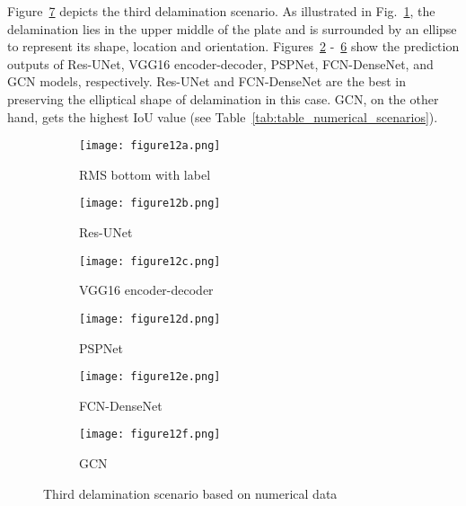 Figure~\ref{fig:475_softmax} depicts the third delamination scenario.
As illustrated in Fig.~\ref{fig:RMS_flat_shell_Vz_475}, the delamination lies in the upper middle of the plate and is surrounded by an ellipse to represent its shape, location and orientation.
Figures~\ref{fig:Unet_Pred__softmax_475} -~\ref{fig:gcn_pred_475} show the prediction outputs of Res-UNet, VGG16 encoder-decoder, PSPNet, FCN-DenseNet, and GCN models, respectively.
Res-UNet and FCN-DenseNet are the best in preserving the elliptical shape of delamination in this case.
GCN, on the other hand, gets the highest IoU value (see Table~\ref{tab:table_numerical_scenarios}).
\begin{figure}[!h]
	\centering
	\begin{subfigure}[b]{0.47\textwidth}
		\centering
		\texttt{[image: figure12a.png]}
		\caption{RMS bottom with label}
		\label{fig:RMS_flat_shell_Vz_475}
	\end{subfigure}
	\hfill
	\begin{subfigure}[b]{0.47\textwidth}
		\centering
		\texttt{[image: figure12b.png]}
		\caption{Res-UNet}
		\label{fig:Unet_Pred__softmax_475}
	\end{subfigure}
	\hfill
	\begin{subfigure}[b]{0.47\textwidth}
		\centering
		\texttt{[image: figure12c.png]}
		\caption{VGG16 encoder-decoder}			\label{fig:vgg16_pred__softmax_475}			
	\end{subfigure}
	\hfill
	\begin{subfigure}[b]{0.47\textwidth}
		\centering
		\texttt{[image: figure12d.png]}
		\caption{PSPNet}
		\label{fig:pspnet_pred__softmax_475}
	\end{subfigure}	
	\hfill
	\begin{subfigure}[b]{0.47\textwidth}
		\centering
		\texttt{[image: figure12e.png]}
		\caption{FCN-DenseNet}
		\label{fig:fcn_densenet_pred__softmax_475}
	\end{subfigure}
	\hfill
	\begin{subfigure}[b]{0.47\textwidth}
		\centering
		\texttt{[image: figure12f.png]}
		\caption{GCN}
		\label{fig:gcn_pred_475}
	\end{subfigure}	
	\caption{Third delamination scenario based on numerical data}
	\label{fig:475_softmax}
\end{figure}
\clearpage

